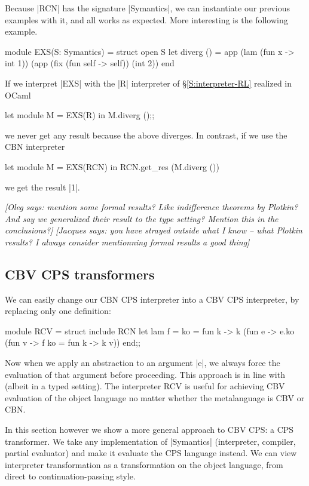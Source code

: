\documentclass[preprint]{sigplanconf}
\newcommand{\jacques}[1]{{\it [Jacques says: #1]}}
\newcommand{\oleg}[1]{{\it [Oleg says: #1]}}
\begin{document}
Because |RCN| has the signature |Symantics|, we can instantiate our previous
examples with it, and all works as expected.  More interesting
is the following example.
\begin{code}
module EXS(S: Symantics) = struct
 open S
 let diverg () = 
   app (lam (fun x -> int 1)) 
       (app (fix (fun self -> self)) (int 2))
end
\end{code}

If we interpret |EXS| with the |R| interpreter of
\S\ref{S:interpreter-RL} realized in OCaml
\begin{code}
let module M = EXS(R) in M.diverg ();;
\end{code}
we never get any result because the above diverges. In contrast, if we use
the CBN interpreter
\begin{code}
let module M = EXS(RCN) in RCN.get_res (M.diverg ())
\end{code}
we get the result |1|.

\oleg{mention some formal results? Like indifference theorems by
  Plotkin? And say we generalized their result to the type setting?
  Mention this in the conclusions?}
\jacques{you have strayed outside what I know -- what Plotkin results?
  I always consider mentionning formal results a good thing}

\subsection{CBV CPS transformers}

We can easily change our CBN CPS interpreter into a CBV CPS
interpreter, by replacing only one definition:
\begin{code}
module RCV = struct
  include RCN
  let lam f = {ko = 
    fun k -> k (fun e -> e.ko 
         (fun v -> f {ko = fun k -> k v}))}
end;;
\end{code}
Now when we apply an abstraction to an argument |e|, we always force
the evaluation of that argument before proceeding. This approach is in
line with \citet{reynolds-relation} (albeit in a typed setting). The interpreter RCV
is useful for achieving CBV evaluation of the object language
no matter whether the metalanguage is CBV or CBN.

In this section however we show a more general approach to CBV CPS:
a CPS transformer. We take any implementation of |Symantics| (interpreter,
compiler, partial evaluator) and make it evaluate the CPS language
instead. We can view interpreter transformation as a
transformation on the object language, from direct to
continuation-passing style.
\end{document}
